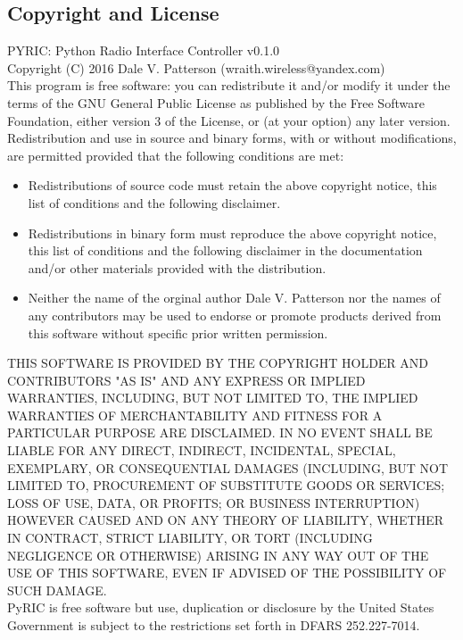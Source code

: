 \documentclass[11pt]{article}
\begin{document}
\begin{appendices}
\section{Copyright and License}\label{sec:copy}
PYRIC: Python Radio Interface Controller v0.1.0\\

Copyright (C) 2016  Dale V. Patterson (wraith.wireless@yandex.com)\\

This program is free software: you can redistribute it and/or modify it under
the terms of the GNU General Public License\cite{gplv3} as published by the Free
Software Foundation, either version 3 of the License, or (at your option) any 
later version.\\

Redistribution and use in source and binary forms, with or without modifications,
are permitted provided that the following conditions are met:
\begin{itemize}
\item Redistributions of source code must retain the above copyright notice, this
list of conditions and the following disclaimer.
\item Redistributions in binary form must reproduce the above copyright notice,
this list of conditions and the following disclaimer in the documentation and/or 
other materials provided with the distribution.
\item Neither the name of the orginal author Dale V. Patterson nor the names of 
any contributors may be used to endorse or promote products derived from this 
software without specific prior written permission.
\end{itemize}

THIS SOFTWARE IS PROVIDED BY THE COPYRIGHT HOLDER AND CONTRIBUTORS "AS IS" AND
ANY EXPRESS OR IMPLIED WARRANTIES, INCLUDING, BUT NOT LIMITED TO, THE IMPLIED
WARRANTIES OF MERCHANTABILITY AND FITNESS FOR A PARTICULAR PURPOSE ARE DISCLAIMED.
IN NO EVENT SHALL BE LIABLE FOR ANY DIRECT, INDIRECT, INCIDENTAL, SPECIAL,
EXEMPLARY, OR CONSEQUENTIAL DAMAGES (INCLUDING, BUT NOT LIMITED TO, PROCUREMENT
OF SUBSTITUTE GOODS OR SERVICES; LOSS OF USE, DATA, OR PROFITS; OR BUSINESS
INTERRUPTION) HOWEVER CAUSED AND ON ANY THEORY OF LIABILITY, WHETHER IN CONTRACT,
STRICT LIABILITY, OR TORT (INCLUDING NEGLIGENCE OR OTHERWISE) ARISING IN ANY WAY
OUT OF THE USE OF THIS SOFTWARE, EVEN IF ADVISED OF THE POSSIBILITY OF SUCH DAMAGE.\\

PyRIC is free software but use, duplication or disclosure by the United States
Government is subject to the restrictions set forth in DFARS 252.227-7014.\\


\end{appendices}
\end{document}

